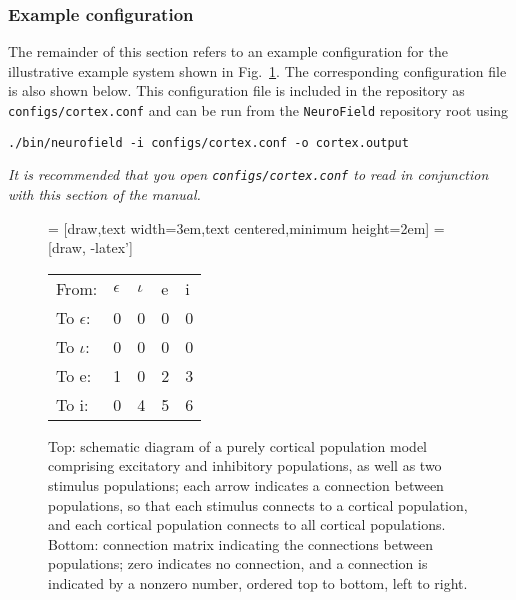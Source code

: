 \documentclass[12pt,a4paper]{article}
\newcommand{\type}[1]{{\small\small\tt #1} }
\newcommand{\NF}[0]{\type{NeuroField}}
\begin{document}
\subsubsection{Example configuration}
The remainder of this section refers to an example configuration for the illustrative example system shown in Fig.~\ref{fig:cortical}. The corresponding configuration file is also shown below. This configuration file is included in the repository as \type{configs/cortex.conf} and can be run from the \NF repository root using

\begin{lstlisting}
./bin/neurofield -i configs/cortex.conf -o cortex.output
\end{lstlisting}

{\em It is recommended that you open \type{configs/cortex.conf} to read in conjunction with this section of the manual.}
\vspace{24pt}

\begin{figure}[h!]
\begin{center}
 = [draw,text width=3em,text centered,minimum height=2em]
 = [draw, -latex']
\end{center}
\vspace{0.2cm}
\begin{center}
\begin{tabular}{ l l l l l }
	From:& $\epsilon$ & $\iota$ & e & i \\
	To $\epsilon$:& 0 & 0 & 0 & 0 \\
	To $\iota$:& 0 & 0 & 0 & 0 \\
	To e:& 1 & 0 & 2 & 3 \\
	To i:& 0 & 4 & 5 & 6
\end{tabular}
\end{center}
\caption{Top: schematic diagram of a purely cortical population model comprising excitatory and inhibitory populations, as well as two stimulus populations; each arrow indicates a connection between populations, so that each stimulus connects to a cortical population, and each cortical population connects to all cortical populations. Bottom: connection matrix indicating the connections between populations; zero indicates no connection, and a connection is indicated by a nonzero number, ordered top to bottom, left to right.}
\label{fig:cortical}
\end{figure}
\end{document}
